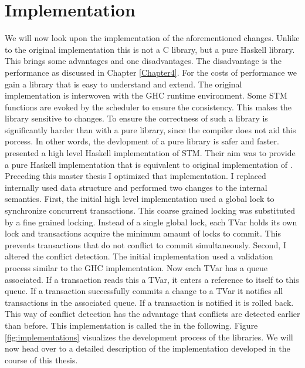 
\chapter{Implementation} %

\label{Chapter3}

We will now look upon the implementation of the aforementioned changes. Unlike to the original
implementation this is not a C library, but a pure Haskell library. This brings some advantages 
and one disadvantages. The disadvantage is the performance as discussed in Chapter \ref{Chapter4}.
For the costs of performance we gain a library that is easy to understand and extend. The original 
implementation is interwoven with the GHC runtime environment. Some STM functions are evoked by 
the scheduler to ensure the consistency. This makes the library sensitive to changes. 
To ensure the correctness of such a library is significantly harder than with a pure library, since
the compiler does not aid this porcess. In other words, the devlopment of a pure library is safer
and faster. \parencite{STMHigh} presented a high level Haskell implementation of STM. Their aim
was to provide a pure Haskell implementation that is equivalent to original implementation of 
\parencite{STMBase}. Preceding this master thesis I optimized that implementation. I replaced
internally used data structure and performed two changes to the internal semantics. First, 
the initial high level implementation used a global lock to synchronize concurrent transactions.
This coarse grained locking was substituted by a fine grained locking. Instead of a single
global lock, each TVar holds its own lock and transactions acquire the minimum amaunt of 
locks to commit. This prevents transactions that do not conflict to commit simultaneously.
Second, I altered the conflict detection. The initial implementation used a validation process
similar to the GHC implementation. Now each TVar has a queue associated. If a transaction reads this 
a TVar, it enters a reference to itself to this queue. If a transaction successfully commits a change to a TVar it 
notifies all transactions in the associated queue. If a transaction is notified it is rolled back.
This way of conflict detection has the advantage that conflicts are detected earlier than before.
This implementation is called the  in the following. Figure 
\ref{fig:implementations} visualizes the development process of the libraries.
We will now head over to a detailed description of the implementation developed in the course of this 
thesis. 

